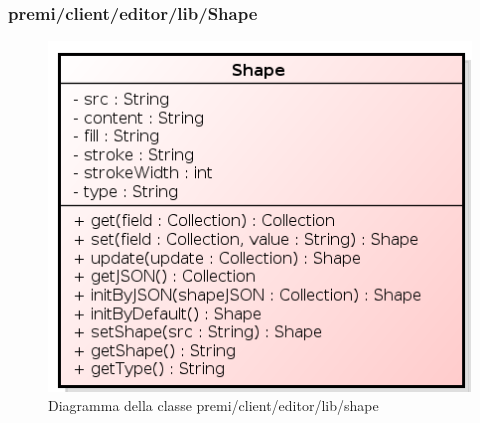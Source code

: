 \subsubsection{premi/client/editor/lib/Shape}
\begin{figure}[h]
\begin{center}
\includegraphics[scale=0.40]{img/diacla/shape.png}
\caption{Diagramma della classe premi/client/editor/lib/shape}
\end{center}
\end{figure}

